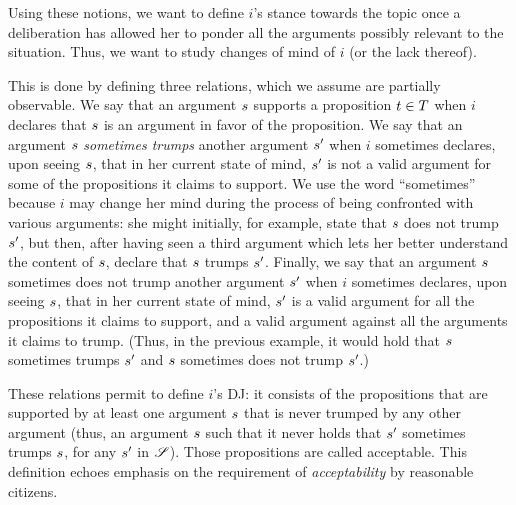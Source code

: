 \documentclass[version=3.21, pagesize, twoside=off, bibliography=totoc, DIV=calc, fontsize=12pt, a4paper, french, english]{scrartcl}
\begin{document}
Using these notions, we want to define $i$’s stance towards the topic once a deliberation has allowed her to ponder all the arguments possibly relevant to the situation. 
Thus, we want to study changes of mind of $i$ (or the lack thereof).

This is done by defining three relations, which we assume are partially observable. We say that an argument $s$ supports a proposition $t \in T$ when $i$ declares that $s$ is an argument in favor of the proposition. We say that an argument $s$ \emph{sometimes trumps} another argument $s'$ when $i$ sometimes declares, upon seeing $s$, that in her current state of mind, $s'$ is not a valid argument for some of the propositions it claims to support. We use the word ``sometimes'' because $i$ may change her mind during the process of being confronted with various arguments: she might initially, for example, state that $s$ does not trump $s'$, but then, after having seen a third argument which lets her better understand the content of $s$, declare that $s$ trumps $s'$. Finally, we say that an argument $s$ sometimes does not trump another argument $s'$ when $i$ sometimes declares, upon seeing $s$, that in her current state of mind, $s'$ is a valid argument for all the propositions it claims to support, and a valid argument against all the arguments it claims to trump. (Thus, in the previous example, it would hold that $s$ sometimes trumps $s'$ and $s$ sometimes does not trump $s'$.)

These relations permit to define $i$'s \ac{DJ}: it consists of the propositions that are supported by at least one argument $s$ that is never trumped by any other argument (thus, an argument $s$ such that it never holds that $s'$ sometimes trumps $s$, for any $s'$ in $\mathscr{S}$). Those propositions are called acceptable. This definition echoes  emphasis on the requirement of \emph{acceptability} by reasonable citizens. 
\end{document}
